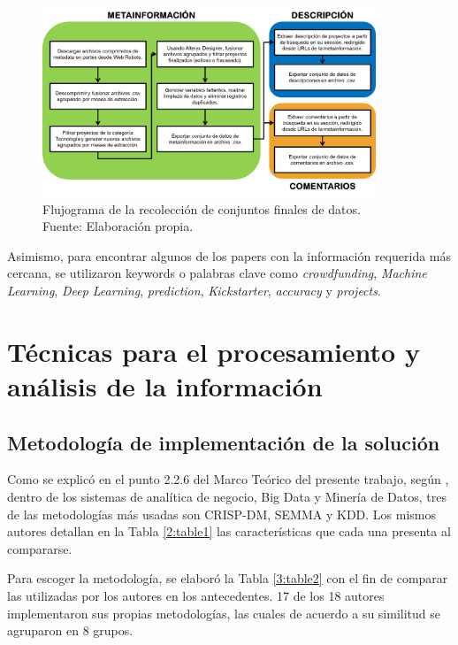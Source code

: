 \begin{figure}[h]
	\begin{center}
		\includegraphics[width=0.89\textwidth]{3/figures/data_recolection_flux.png}
		\caption[Flujograma de la recolección de conjuntos finales de datos]{Flujograma de la recolección de conjuntos finales de datos.\\
			Fuente: Elaboración propia.}
		\label{3:fig1}
	\end{center}
\end{figure}

Asimismo, para encontrar algunos de los papers con la información requerida más cercana, se utilizaron keywords o palabras clave como \textit{crowdfunding}, \textit{Machine Learning}, \textit{Deep Learning}, \textit{prediction}, \textit{Kickstarter}, \textit{accuracy} y \textit{projects}.

\section{Técnicas para el procesamiento y análisis de la información}

\subsection{Metodología de implementación de la solución}
Como se explicó en el punto 2.2.6 del Marco Teórico del presente trabajo, según \cite{tec_braulio2015metodologiasdm}, dentro de los sistemas de analítica de negocio, Big Data y Minería de Datos, tres de las metodologías más usadas son CRISP-DM, SEMMA y KDD. Los mismos autores detallan en la Tabla \ref{2:table1} las características que cada una presenta al compararse.

Para escoger la metodología, se elaboró la Tabla \ref{3:table2} con el fin de comparar las utilizadas por los autores en los antecedentes. 17 de los 18 autores implementaron sus propias metodologías, las cuales de acuerdo a su similitud se agruparon en 8 grupos.

